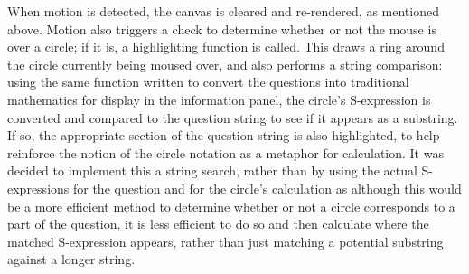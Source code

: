 \documentclass[12pt,twoside,notitlepage,xetex]{report}
\begin{document}
When motion is detected, the canvas is cleared and re-rendered, as mentioned above.  Motion also triggers a check to determine whether or not the mouse is over a circle; if it is, a highlighting function is called.  This draws a ring around the circle currently being moused over, and also performs a string comparison:  using the same function written to convert the questions into traditional mathematics for display in the information panel, the circle's S-expression is converted and compared to the question string to see if it appears as a substring.  If so, the appropriate section of the question string is also highlighted, to help reinforce the notion of the circle notation as a metaphor for calculation.  It was decided to implement this a string search, rather than by using the actual S-expressions for the question and for the circle's calculation as although this would be a more efficient method to determine whether or not a circle corresponds to a part of the question, it is less efficient to do so and then calculate where the matched S-expression appears, rather than just matching a potential substring against a longer string.
\end{document}
